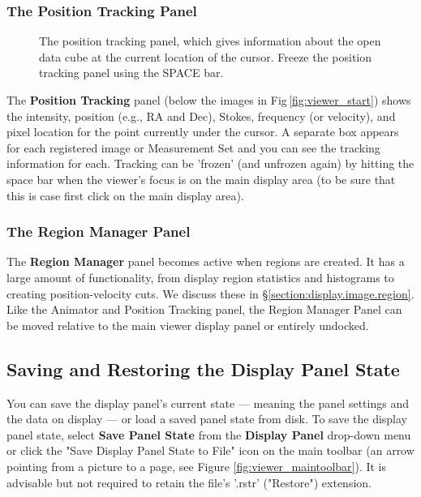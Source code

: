\subsubsection{The Position Tracking Panel}

\begin{figure}[h!]
\begin{center}
\caption{\label{fig:viewer_position} The position tracking panel, which gives information about the open data cube
at the current location of the cursor. Freeze the position tracking panel using the SPACE bar.}
\hrulefill
\end{center}
\end{figure}

The {\bf Position Tracking} panel (below the images in Fig\,\ref{fig:viewer_start})
shows the intensity, position (e.g., RA and Dec), Stokes, frequency 
(or velocity), and pixel location for the point currently under the cursor.  A separate box
appears for each registered image or Measurement Set and you can see the
tracking information for each.  Tracking can be 'frozen' (and unfrozen again)
by hitting the space bar when the viewer's focus is on the main display area 
(to be sure that this is case first click on the main display area).

\subsubsection{The Region Manager Panel}

The {\bf Region Manager} panel becomes active when regions
are created. It has a large amount of functionality, from
display region statistics and histograms to creating position-velocity cuts.
We discuss these in \S\ref{section:display.image.region}. Like the 
Animator and Position Tracking panel, the Region Manager Panel can
be moved relative to the main viewer display panel or entirely undocked.


\subsection{Saving and Restoring the Display Panel State}
\label{section:display.viewerGUI.save-restore}

You can save the display panel's current state --- meaning the 
panel settings and the data on display --- or load a saved panel
state from disk. To save the display panel state, select {\bf Save Panel State}
from the {\bf Display Panel} drop-down menu or click the 
"Save Display Panel State to File" icon on the main toolbar 
(an arrow pointing from a picture to a page, see Figure
\ref{fig:viewer_maintoolbar}). It is advisable but not required to retain the file's '.rstr' ("Restore")
extension.

